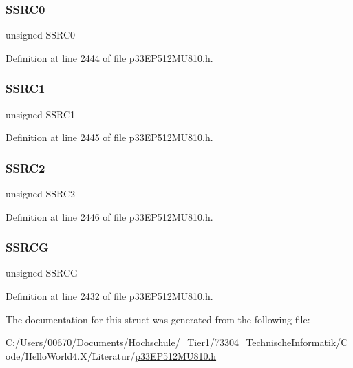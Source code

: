 \subsubsection{\texorpdfstring{S\+S\+R\+C0}{SSRC0}}
{\footnotesize\ttfamily unsigned S\+S\+R\+C0}



Definition at line 2444 of file p33\+E\+P512\+M\+U810.\+h.

\mbox{\label{structtag_a_d1_c_o_n1_b_i_t_s_aefc0488a9751bcca8f6363a20530a1cf}} 
\subsubsection{\texorpdfstring{S\+S\+R\+C1}{SSRC1}}
{\footnotesize\ttfamily unsigned S\+S\+R\+C1}



Definition at line 2445 of file p33\+E\+P512\+M\+U810.\+h.

\mbox{\label{structtag_a_d1_c_o_n1_b_i_t_s_a95ec48e12cb5dc231b4951f71d394eac}} 
\subsubsection{\texorpdfstring{S\+S\+R\+C2}{SSRC2}}
{\footnotesize\ttfamily unsigned S\+S\+R\+C2}



Definition at line 2446 of file p33\+E\+P512\+M\+U810.\+h.

\mbox{\label{structtag_a_d1_c_o_n1_b_i_t_s_a70991a103c529d7b9b7fde74950ee286}} 
\subsubsection{\texorpdfstring{S\+S\+R\+CG}{SSRCG}}
{\footnotesize\ttfamily unsigned S\+S\+R\+CG}



Definition at line 2432 of file p33\+E\+P512\+M\+U810.\+h.



The documentation for this struct was generated from the following file\+:\begin{DoxyCompactItemize}
\item 
C\+:/\+Users/00670/\+Documents/\+Hochschule/\+\_\+\+Tier1/73304\+\_\+\+Technische\+Informatik/\+Code/\+Hello\+World4.\+X/\+Literatur/\hyperlink{p33_e_p512_m_u810_8h}{p33\+E\+P512\+M\+U810.\+h}\end{DoxyCompactItemize}
